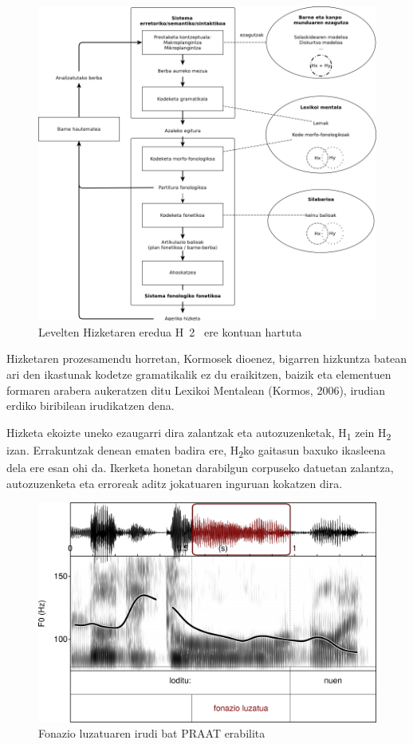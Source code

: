 \documentclass[]{article}
\begin{document}
\begin{figure}

{\centering \includegraphics[width=0.8\linewidth]{./grafikoak/Levelten_eredua_Nik-garden} 

}

\caption{Levelten Hizketaren eredua H~2~ ere kontuan hartuta}\label{fig:levelt}
\end{figure}

Hizketaren prozesamendu horretan, Kormosek dioenez, bigarren hizkuntza
batean ari den ikastunak kodetze gramatikalik ez du eraikitzen, baizik
eta elementuen formaren arabera aukeratzen ditu Lexikoi Mentalean
(Kormos, 2006), irudian erdiko biribilean irudikatzen dena.

Hizketa ekoizte uneko ezaugarri dira zalantzak eta autozuzenketak,
H\textsubscript{1} zein H\textsubscript{2} izan. Errakuntzak denean
ematen badira ere, H\textsubscript{2}ko gaitasun baxuko ikasleena dela
ere esan ohi da. Ikerketa honetan darabilgun corpuseko datuetan
zalantza, autozuzenketa eta erroreak aditz jokatuaren inguruan kokatzen
dira.

\begin{figure}

{\centering \includegraphics[width=0.8\linewidth]{./grafikoak/luz1} 

}

\caption{Fonazio luzatuaren irudi bat PRAAT erabilita}\label{fig:unnamed-chunk-1}
\end{figure}
\end{document}
